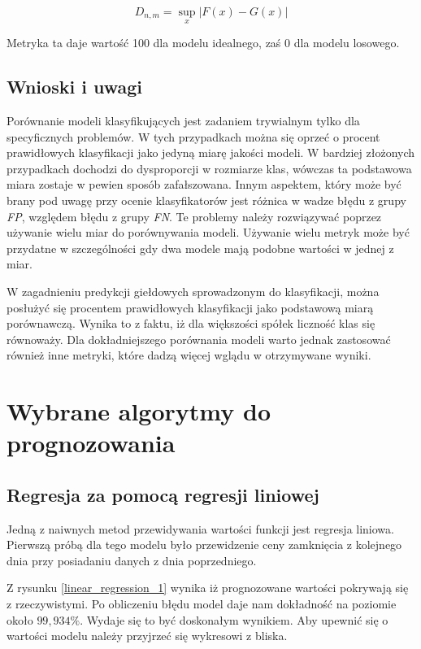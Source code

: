 \documentclass[a4paper, twoside, 11pt, openright]{article}
\begin{document}
$$D_{n,m}=\sup_x|F(x)-G(x)|$$

Metryka ta daje wartość 100 dla modelu idealnego, zaś 0 dla modelu losowego.

\subsection{Wnioski i uwagi}

Porównanie modeli klasyfikujących jest zadaniem trywialnym tylko dla specyficznych problemów. W tych przypadkach można się oprzeć o procent prawidłowych klasyfikacji jako jedyną miarę jakości modeli. W bardziej złożonych przypadkach dochodzi do dysproporcji w rozmiarze klas, wówczas ta podstawowa miara zostaje w pewien sposób zafałszowana. Innym aspektem, który może być brany pod uwagę przy ocenie klasyfikatorów jest różnica w wadze błędu z grupy \textit{FP}, względem błędu z grupy \textit{FN}. Te problemy należy rozwiązywać poprzez używanie wielu miar do porównywania modeli. Używanie wielu metryk może być przydatne w szczególności gdy dwa modele mają podobne wartości w jednej z miar.

\bigskip

W zagadnieniu predykcji giełdowych sprowadzonym do klasyfikacji, można posłużyć się procentem prawidłowych klasyfikacji jako podstawową miarą porównawczą. Wynika to z faktu, iż dla większości spółek liczność klas się równoważy. Dla dokładniejszego porównania modeli warto jednak zastosować również inne metryki, które dadzą więcej wglądu w otrzymywane wyniki.

\newpage

\section{Wybrane algorytmy do prognozowania}

\subsection{Regresja za pomocą regresji liniowej}

Jedną z naiwnych metod przewidywania wartości funkcji jest regresja liniowa. Pierwszą próbą dla tego modelu było przewidzenie ceny zamknięcia z kolejnego dnia przy posiadaniu danych z dnia poprzedniego.

Z rysunku \ref{linear_regression_1} wynika iż prognozowane wartości pokrywają się z rzeczywistymi. Po obliczeniu błędu model daje nam dokładność na poziomie około  $99,934\%$. Wydaje się to być doskonałym wynikiem. Aby upewnić się o wartości modelu należy przyjrzeć się wykresowi z bliska.
\end{document}
